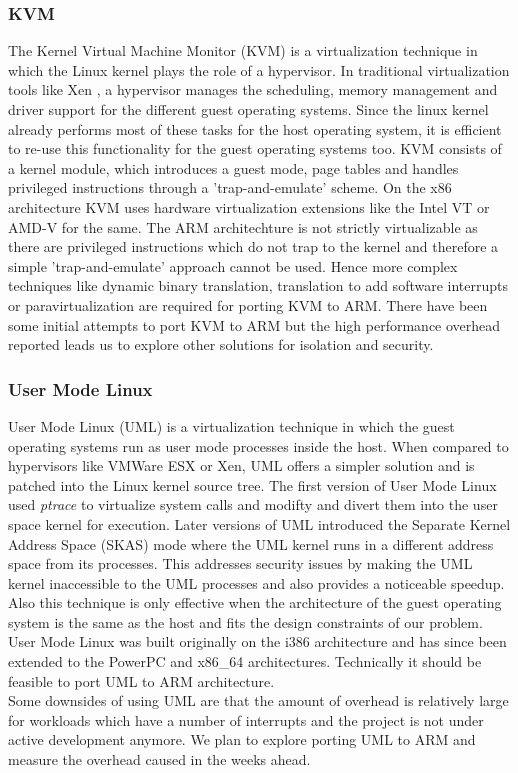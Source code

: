 \subsubsection{KVM}
The Kernel Virtual Machine Monitor (KVM) is a virtualization technique in which the Linux kernel plays the role of a hypervisor. In traditional virtualization tools like Xen \cite{xen}, a hypervisor manages the scheduling, memory management and driver support for the different guest operating systems. Since the linux kernel already performs most of these tasks for the host operating system, it is efficient to re-use this functionality for the guest operating systems too. KVM consists of a kernel module, which introduces a guest mode,  page tables and handles privileged instructions through a 'trap-and-emulate' scheme. On the x86 architecture KVM uses hardware virtualization extensions like the Intel VT or AMD-V for the same. 
The ARM architechture is not strictly virtualizable as there are privileged instructions which do not trap to the kernel and therefore a simple 'trap-and-emulate' approach cannot be used. Hence more complex techniques like dynamic binary translation, translation to add software interrupts or paravirtualization are required for porting KVM to ARM. There have been some initial attempts to port KVM to ARM \cite{columbia} but the high performance overhead reported leads us to explore other solutions for isolation and security. 

\subsubsection{User Mode Linux}
User Mode Linux (UML) is a virtualization technique in which the guest operating systems run as user mode processes inside the host. When compared to hypervisors like VMWare ESX or Xen, UML offers a simpler solution and is patched into the Linux kernel source tree. The first version of User Mode Linux used \emph{ptrace} to virtualize system calls and modifty and divert them into the user space kernel for execution. Later versions of UML introduced the Separate Kernel Address Space (SKAS) mode  where the UML kernel runs in a different address space from its processes. This addresses security issues by making the UML kernel inaccessible to the UML processes and also provides a noticeable speedup. Also this technique is only effective when the architecture of the guest operating system is the same as the host and fits the design constraints of our problem. User Mode Linux was built originally on the i386 architecture and has since been extended to the PowerPC and x86\_64 architectures. Technically it should be feasible to port UML to ARM architecture. \\
Some downsides of using UML are that the amount of overhead is relatively large for workloads which have a number of interrupts and the project is not under active development anymore. We plan to explore porting UML to ARM and measure the overhead caused in the weeks ahead. 

